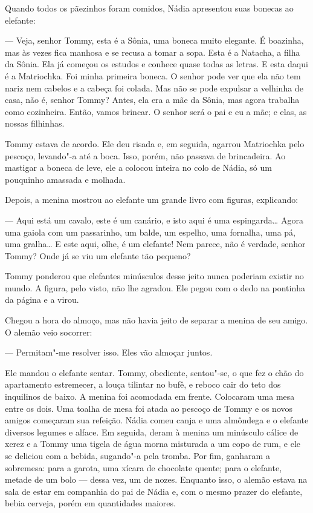 Quando todos os pãezinhos foram comidos, Nádia apresentou suas bonecas
ao elefante:

--- Veja, senhor Tommy, esta é a Sônia, uma boneca muito elegante. É boazinha, mas às vezes fica manhosa e se recusa a tomar a sopa.
Esta é a Natacha, a filha da Sônia. Ela já começou os estudos e conhece
quase todas as letras. E esta daqui é a Matriochka. Foi minha primeira
boneca. O senhor pode ver que ela não tem nariz nem cabelos e a cabeça
foi colada. Mas não se pode expulsar a velhinha de casa, não é, senhor Tommy? Antes, ela era a mãe da Sônia, mas agora trabalha como
cozinheira. Então, vamos brincar. O senhor será o pai e eu a mãe; e
elas, as nossas filhinhas.

Tommy estava de acordo. Ele deu risada e, em seguida, agarrou Matriochka
pelo pescoço, levando"-a até a boca. Isso, porém, não passava de
brincadeira. Ao mastigar a boneca de leve, ele a colocou inteira no colo
de Nádia, só um pouquinho amassada e molhada.

Depois, a menina mostrou ao elefante um grande livro com figuras,
explicando:

--- Aqui está um cavalo, este é um canário, e isto aqui é uma
espingarda\ldots{} Agora uma gaiola com um passarinho, um balde, um espelho,
uma fornalha, uma pá, uma gralha\ldots{} E este aqui, olhe, é um elefante!
Nem parece, não é verdade, senhor Tommy? Onde já se viu um elefante tão
pequeno?

Tommy ponderou que elefantes minúsculos desse jeito nunca poderiam existir no
mundo. A figura, pelo visto, não lhe agradou. Ele pegou com o dedo na
pontinha da página e a virou.

Chegou a hora do almoço, mas não havia jeito de separar a menina de seu
amigo. O alemão veio socorrer:

--- Permitam"-me resolver isso. Eles vão almoçar juntos.

Ele mandou o elefante sentar. Tommy, obediente, sentou"-se, o que fez o
chão do apartamento estremecer, a louça tilintar no bufê, e reboco cair
do teto dos inquilinos de baixo. A menina foi acomodada em frente.
Colocaram uma mesa entre os dois. Uma toalha de mesa foi atada ao
pescoço de Tommy e os novos amigos começaram sua refeição. Nádia comeu
canja e uma almôndega e o elefante diversos legumes e alface. Em
seguida, deram à menina um minúsculo cálice de xerez e a Tommy uma
tigela de água morna misturada a um copo de rum, e ele se deliciou com a
bebida, sugando"-a pela tromba. Por fim, ganharam a sobremesa: para a
garota, uma xícara de chocolate quente; para o elefante, metade de um
bolo --- dessa vez, um de nozes. Enquanto isso, o alemão estava na sala
de estar em companhia do pai de Nádia e, com o mesmo prazer do elefante,
bebia cerveja, porém em quantidades maiores.

